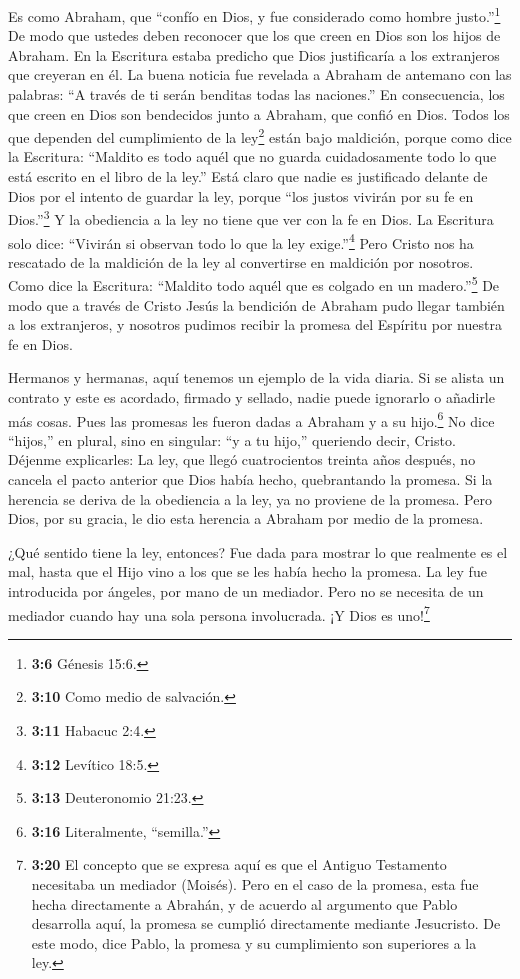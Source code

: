  Es como Abraham, que ``confío en Dios, y fue considerado
como hombre justo.''\footnote{\textbf{3:6} Génesis 15:6.} 
De modo que ustedes deben reconocer que los que creen en Dios son los
hijos de Abraham.  En la Escritura estaba predicho que Dios
justificaría a los extranjeros que creyeran en él. La buena noticia fue
revelada a Abraham de antemano con las palabras: ``A través de ti serán
benditas todas las naciones.''  En consecuencia, los que
creen en Dios son bendecidos junto a Abraham, que confió en Dios.
 Todos los que dependen del cumplimiento de la
ley\footnote{\textbf{3:10} Como medio de salvación.} están bajo
maldición, porque como dice la Escritura: ``Maldito es todo aquél que no
guarda cuidadosamente todo lo que está escrito en el libro de la ley.''
 Está claro que nadie es justificado delante de Dios por el
intento de guardar la ley, porque ``los justos vivirán por su fe en
Dios.''\footnote{\textbf{3:11} Habacuc 2:4.}  Y la
obediencia a la ley no tiene que ver con la fe en Dios. La Escritura
solo dice: ``Vivirán si observan todo lo que la ley exige.''\footnote{\textbf{3:12}
  Levítico 18:5.}  Pero Cristo nos ha rescatado de la
maldición de la ley al convertirse en maldición por nosotros. Como dice
la Escritura: ``Maldito todo aquél que es colgado en un
madero.''\footnote{\textbf{3:13} Deuteronomio 21:23.}  De
modo que a través de Cristo Jesús la bendición de Abraham pudo llegar
también a los extranjeros, y nosotros pudimos recibir la promesa del
Espíritu por nuestra fe en Dios.

 Hermanos y hermanas, aquí tenemos un ejemplo de la vida
diaria. Si se alista un contrato y este es acordado, firmado y sellado,
nadie puede ignorarlo o añadirle más cosas.  Pues las
promesas les fueron dadas a Abraham y a su hijo.\footnote{\textbf{3:16}
  Literalmente, ``semilla.''} No dice ``hijos,'' en plural, sino en
singular: ``y a tu hijo,'' queriendo decir, Cristo. 
Déjenme explicarles: La ley, que llegó cuatrocientos treinta años
después, no cancela el pacto anterior que Dios había hecho, quebrantando
la promesa.  Si la herencia se deriva de la obediencia a la
ley, ya no proviene de la promesa. Pero Dios, por su gracia, le dio esta
herencia a Abraham por medio de la promesa.

 ¿Qué sentido tiene la ley, entonces? Fue dada para mostrar
lo que realmente es el mal, hasta que el Hijo vino a los que se les
había hecho la promesa. La ley fue introducida por ángeles, por mano de
un mediador.  Pero no se necesita de un mediador cuando hay
una sola persona involucrada. ¡Y Dios es uno!\footnote{\textbf{3:20} El
  concepto que se expresa aquí es que el Antiguo Testamento necesitaba
  un mediador (Moisés). Pero en el caso de la promesa, esta fue hecha
  directamente a Abrahán, y de acuerdo al argumento que Pablo desarrolla
  aquí, la promesa se cumplió directamente mediante Jesucristo. De este
  modo, dice Pablo, la promesa y su cumplimiento son superiores a la
  ley.}

